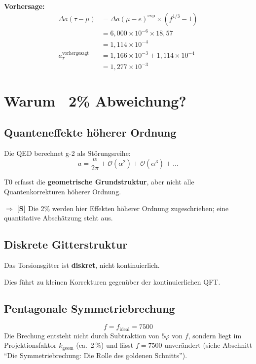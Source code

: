 	\textbf{Vorhersage:}
	\begin{align}
		\Delta a(\tau - \mu) &= \Delta a(\mu - e)^{\text{exp}} \times (f^{1/3} - 1) \\
		&= 6{,}000 \times 10^{-6} \times 18{,}57 \\
		&= 1{,}114 \times 10^{-4} \\
		a_\tau^{\text{vorhergesagt}} &= 1{,}166 \times 10^{-3} + 1{,}114 \times 10^{-4} \\
		&= 1{,}277 \times 10^{-3}
	\end{align}
	
	\section{Warum ~2\% Abweichung?}
	
	\subsection{Quanteneffekte höherer Ordnung}
	
	Die QED berechnet g-2 als Störungsreihe:
	\begin{equation}
		a = \frac{\alpha}{2\pi} + \mathcal{O}(\alpha^2) + \mathcal{O}(\alpha^3) + \ldots
	\end{equation}
	
	T0 erfasst die \textbf{geometrische Grundstruktur}, aber nicht alle Quantenkorrekturen höherer Ordnung.
	
	$\Rightarrow$ \textbf{[S]} Die 2\% werden hier Effekten höherer Ordnung zugeschrieben; eine quantitative Abschätzung steht aus.
	
	\subsection{Diskrete Gitterstruktur}
	
	Das Torsionsgitter ist \textbf{diskret}, nicht kontinuierlich.
	
	Dies führt zu kleinen Korrekturen gegenüber der kontinuierlichen QFT.
	
	\subsection{Pentagonale Symmetriebrechung}
	
	\begin{equation}
		f = f_{\text{ideal}} = 7500
	\end{equation}
	Die Brechung entsteht nicht durch Subtraktion von $5\varphi$ von $f$, sondern liegt im Projektionsfaktor $k_\text{geom}$ (ca.\ 2\,\%) und lässt $f = 7500$ unverändert (siehe Abschnitt \enquote{Die Symmetriebrechung: Die Rolle des goldenen Schnitts}).
	
